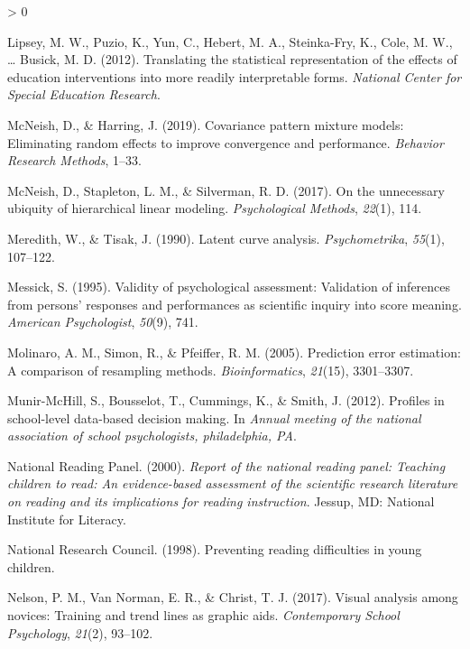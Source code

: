 \documentclass[
  english,
  man, fleqn, noextraspace]{apa6}
\newlength{\cslhangindent}
\newenvironment{CSLReferences}[2] %
 {%
  \setlength{\parindent}{0pt}
  \ifodd #1 \everypar{\setlength{\hangindent}{\cslhangindent}}\ignorespaces\fi
  \ifnum #2 > 0
  \setlength{\parskip}{#2\baselineskip}
  \fi
 }%
 {}
\begin{document}
\begin{CSLReferences}{1}{0}
\leavevmode\hypertarget{ref-lipsey2012}{}%
Lipsey, M. W., Puzio, K., Yun, C., Hebert, M. A., Steinka-Fry, K., Cole, M. W., \ldots{} Busick, M. D. (2012). Translating the statistical representation of the effects of education interventions into more readily interpretable forms. \emph{National Center for Special Education Research}.

\leavevmode\hypertarget{ref-mcneish2019}{}%
McNeish, D., \& Harring, J. (2019). Covariance pattern mixture models: Eliminating random effects to improve convergence and performance. \emph{Behavior Research Methods}, 1--33.

\leavevmode\hypertarget{ref-mcneishetal2017}{}%
McNeish, D., Stapleton, L. M., \& Silverman, R. D. (2017). On the unnecessary ubiquity of hierarchical linear modeling. \emph{Psychological Methods}, \emph{22}(1), 114.

\leavevmode\hypertarget{ref-meredithtisak1990}{}%
Meredith, W., \& Tisak, J. (1990). Latent curve analysis. \emph{Psychometrika}, \emph{55}(1), 107--122.

\leavevmode\hypertarget{ref-messick1995}{}%
Messick, S. (1995). Validity of psychological assessment: Validation of inferences from persons' responses and performances as scientific inquiry into score meaning. \emph{American Psychologist}, \emph{50}(9), 741.

\leavevmode\hypertarget{ref-molinaro2005}{}%
Molinaro, A. M., Simon, R., \& Pfeiffer, R. M. (2005). Prediction error estimation: A comparison of resampling methods. \emph{Bioinformatics}, \emph{21}(15), 3301--3307.

\leavevmode\hypertarget{ref-munir2012}{}%
Munir-McHill, S., Bousselot, T., Cummings, K., \& Smith, J. (2012). Profiles in school-level data-based decision making. In \emph{Annual meeting of the national association of school psychologists, philadelphia, PA}.

\leavevmode\hypertarget{ref-readingpanel2000}{}%
National Reading Panel. (2000). \emph{Report of the national reading panel: Teaching children to read: An evidence-based assessment of the scientific research literature on reading and its implications for reading instruction}. Jessup, MD: National Institute for Literacy.

\leavevmode\hypertarget{ref-national1998}{}%
National Research Council. (1998). Preventing reading difficulties in young children.

\leavevmode\hypertarget{ref-nelson2017}{}%
Nelson, P. M., Van Norman, E. R., \& Christ, T. J. (2017). Visual analysis among novices: Training and trend lines as graphic aids. \emph{Contemporary School Psychology}, \emph{21}(2), 93--102.


\end{CSLReferences}
\end{document}
